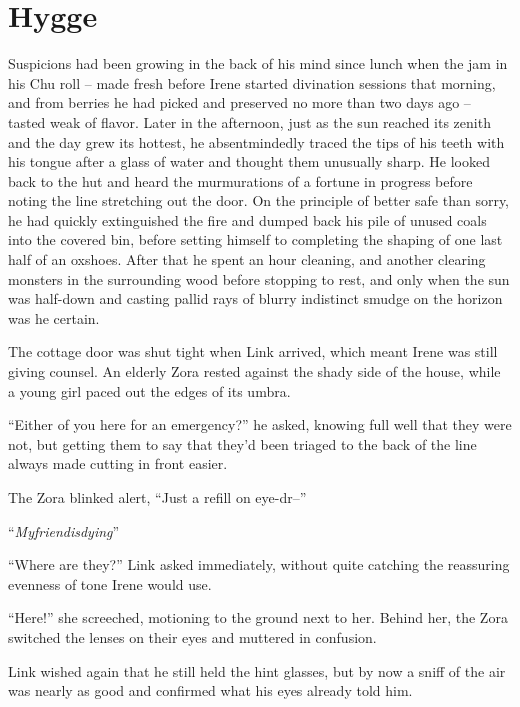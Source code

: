 \documentclass[../FGP.tex]{subfiles}
\begin{document}
\section{Hygge}
\begin{fragment}Suspicions had been growing in the back of his mind since lunch when the jam in his Chu roll -- made fresh before Irene started divination sessions that morning, and from berries he had picked and preserved no more than two days ago -- tasted weak of flavor. Later in the afternoon, just as the sun reached its zenith and the day grew its hottest, he absentmindedly traced the tips of his teeth with his tongue after a glass of water and thought them unusually sharp. He looked back to the hut and heard the murmurations of a fortune in progress before noting the line stretching out the door. On the principle of better safe than sorry, he had quickly extinguished the fire and dumped back his pile of unused coals into the covered bin, before setting himself to completing the shaping of one last half of an oxshoes. After that he spent an hour cleaning, and another clearing monsters in the surrounding wood before stopping to rest, and only when the sun was half-down and casting pallid rays of blurry indistinct smudge on the horizon was he certain.

The cottage door was shut tight when Link arrived, which meant Irene was still giving counsel. An elderly Zora rested against the shady side of the house, while a young girl paced out the edges of its umbra.

``Either of you here for an emergency?'' he asked, knowing full well that they were not, but getting them to say that they'd been triaged to the back of the line always made cutting in front easier.

The Zora blinked alert, ``Just a refill on eye-dr--''  

``\emph{Myfriendisdying}'' 

``Where are they?'' Link asked immediately, without quite catching the reassuring evenness of tone Irene would use.  %

``Here!'' she screeched, motioning to the ground next to her. Behind her, the Zora switched the lenses on their eyes and muttered in confusion.

Link wished again that he still held the hint glasses, but by now a sniff of the air was nearly as good and confirmed what his eyes already told him.


\end{fragment}
\end{document}
